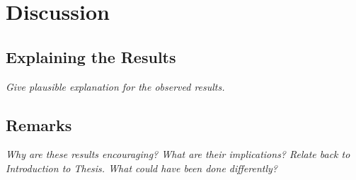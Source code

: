 
\chapter{Discussion}
\label{ch:discussion}

\section{Explaining the Results}

\textit{Give plausible explanation for the observed results.}

\section{Remarks}

\textit{Why are these results encouraging? What are their implications? Relate
back to Introduction to Thesis. What could have been done differently?}
